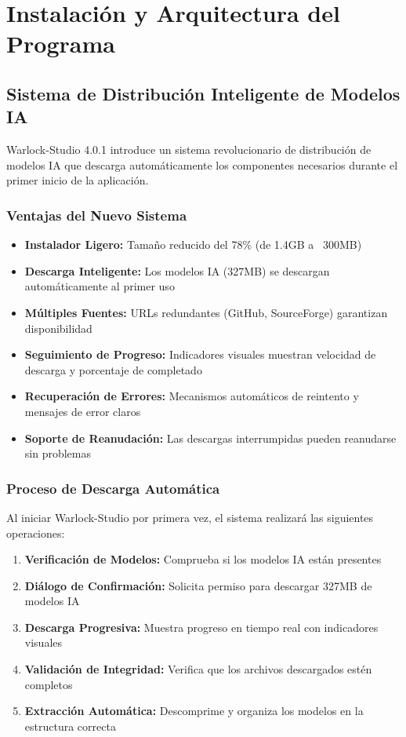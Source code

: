 \documentclass[11pt, a4paper]{article}
\begin{document}
\section{Instalación y Arquitectura del Programa}

\subsection{Sistema de Distribución Inteligente de Modelos IA}
\begin{infobox}
Warlock-Studio 4.0.1 introduce un sistema revolucionario de distribución de modelos IA que descarga automáticamente los componentes necesarios durante el primer inicio de la aplicación.
\end{infobox}

\subsubsection{Ventajas del Nuevo Sistema}
\begin{itemize}[leftmargin=*]
    \item \textbf{Instalador Ligero:} Tamaño reducido del 78\% (de 1.4GB a ~300MB)
    \item \textbf{Descarga Inteligente:} Los modelos IA (327MB) se descargan automáticamente al primer uso
    \item \textbf{Múltiples Fuentes:} URLs redundantes (GitHub, SourceForge) garantizan disponibilidad
    \item \textbf{Seguimiento de Progreso:} Indicadores visuales muestran velocidad de descarga y porcentaje de completado
    \item \textbf{Recuperación de Errores:} Mecanismos automáticos de reintento y mensajes de error claros
    \item \textbf{Soporte de Reanudación:} Las descargas interrumpidas pueden reanudarse sin problemas
\end{itemize}

\subsubsection{Proceso de Descarga Automática}
Al iniciar Warlock-Studio por primera vez, el sistema realizará las siguientes operaciones:
\begin{enumerate}[leftmargin=*]
    \item \textbf{Verificación de Modelos:} Comprueba si los modelos IA están presentes
    \item \textbf{Diálogo de Confirmación:} Solicita permiso para descargar 327MB de modelos IA
    \item \textbf{Descarga Progresiva:} Muestra progreso en tiempo real con indicadores visuales
    \item \textbf{Validación de Integridad:} Verifica que los archivos descargados estén completos
    \item \textbf{Extracción Automática:} Descomprime y organiza los modelos en la estructura correcta
\end{enumerate}
\end{document}

